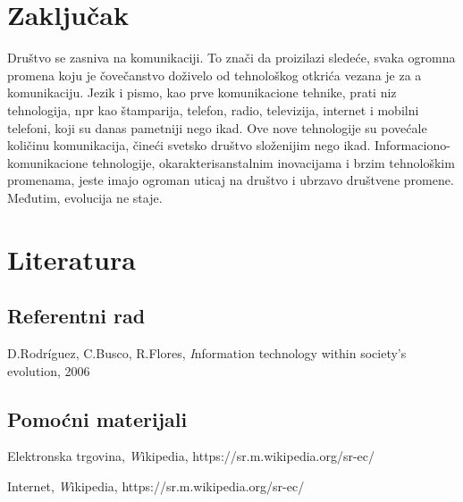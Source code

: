\documentclass[12pt]{article}
\begin{document}
    \section{Zaključak}
 
    Društvo se zasniva na komunikaciji. To znači da proizilazi sledeće, svaka ogromna promena koju je čovečanstvo doživelo od tehnološkog otkrića vezana je za a komunikaciju. Jezik i pismo, kao prve komunikacione tehnike, prati niz tehnologija, npr kao štamparija, telefon, radio, televizija, internet i mobilni  telefoni, koji su danas pametniji nego ikad. Ove nove tehnologije su povećale količinu komunikacija, čineći svetsko društvo složenijim nego ikad. Informaciono-komunikacione tehnologije, okarakterisanstalnim inovacijama i brzim tehnološkim promenama, jeste imajo ogroman uticaj na društvo i ubrzavo društvene promene. Međutim, evolucija ne staje.
    
    \linespread{4}
    
	\section*{Literatura}
	\subsection*{Referentni rad}
	
		 \item D.Rodríguez, C.Busco, R.Flores,  \emph Information technology within society's evolution, 2006
		 
	\subsection*{Pomoćni materijali}
	
		 \item Elektronska trgovina, \emph Wikipedia, https://sr.m.wikipedia.org/sr-ec/
		 \item Internet,  \emph Wikipedia,  https://sr.m.wikipedia.org/sr-ec/
		 

	
\end{document}
